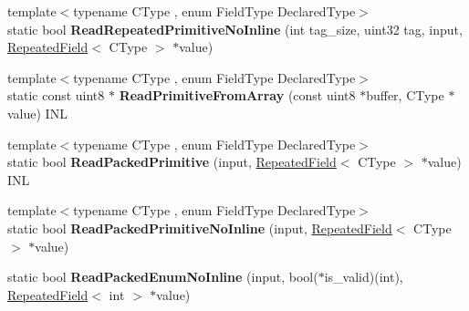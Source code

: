 \begin{DoxyCompactItemize}
\item 
\mbox{\label{classgoogle_1_1protobuf_1_1internal_1_1WireFormatLite_a816aa343268b474630cd0a16a64eec6a}} 
{\footnotesize template$<$typename C\+Type , enum Field\+Type Declared\+Type$>$ }\\static bool {\bfseries Read\+Repeated\+Primitive\+No\+Inline} (int tag\+\_\+size, uint32 tag, input, \hyperlink{classgoogle_1_1protobuf_1_1RepeatedField}{Repeated\+Field}$<$ C\+Type $>$ $\ast$value)
\item 
\mbox{\label{classgoogle_1_1protobuf_1_1internal_1_1WireFormatLite_a425362d04a2fb7307c9f606c4f27615e}} 
{\footnotesize template$<$typename C\+Type , enum Field\+Type Declared\+Type$>$ }\\static const uint8 $\ast$ {\bfseries Read\+Primitive\+From\+Array} (const uint8 $\ast$buffer, C\+Type $\ast$value) I\+NL
\item 
\mbox{\label{classgoogle_1_1protobuf_1_1internal_1_1WireFormatLite_a067946322d27a8adf7514adc4bb4f5a2}} 
{\footnotesize template$<$typename C\+Type , enum Field\+Type Declared\+Type$>$ }\\static bool {\bfseries Read\+Packed\+Primitive} (input, \hyperlink{classgoogle_1_1protobuf_1_1RepeatedField}{Repeated\+Field}$<$ C\+Type $>$ $\ast$value) I\+NL
\item 
\mbox{\label{classgoogle_1_1protobuf_1_1internal_1_1WireFormatLite_a91104beb17c682c6d516a046499961cd}} 
{\footnotesize template$<$typename C\+Type , enum Field\+Type Declared\+Type$>$ }\\static bool {\bfseries Read\+Packed\+Primitive\+No\+Inline} (input, \hyperlink{classgoogle_1_1protobuf_1_1RepeatedField}{Repeated\+Field}$<$ C\+Type $>$ $\ast$value)
\item 
\mbox{\label{classgoogle_1_1protobuf_1_1internal_1_1WireFormatLite_a77be9cabe6a1914a76d82b079eea77c9}} 
static bool {\bfseries Read\+Packed\+Enum\+No\+Inline} (input, bool($\ast$is\+\_\+valid)(int), \hyperlink{classgoogle_1_1protobuf_1_1RepeatedField}{Repeated\+Field}$<$ int $>$ $\ast$value)
\item 

\end{DoxyCompactItemize}
